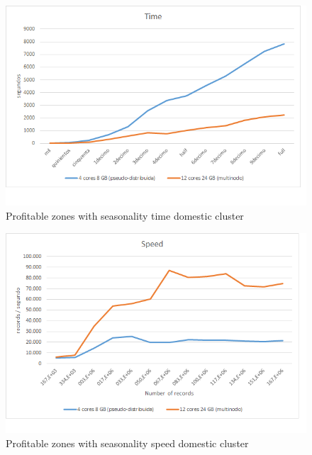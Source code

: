\begin{figure}[htp!]
	\centering
	\caption{Profitable zones with seasonality time domestic cluster}
	\label{tpdd}
	\vspace{5pt}
	\includegraphics[scale=0.8]{geng/tpdd}
\end{figure}
\begin{figure}[htp!]
	\centering
	\caption{Profitable zones with seasonality speed domestic cluster}
	\label{spdd}
	\vspace{5pt}
	\includegraphics[scale=0.85]{geng/spdd}
\end{figure}
